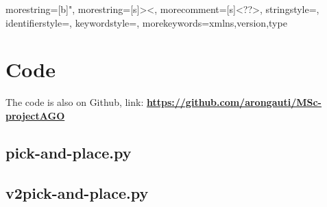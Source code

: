 


{
  morestring=[b]",
  morestring=[s]{>}{<},
  morecomment=[s]{<?}{?>},
  stringstyle=\color{black},
  identifierstyle=\color{darkblue},
  keywordstyle=\color{cyan},
  morekeywords={xmlns,version,type}%
}
\appendix



\chapter{Code}  \label{app:code}
The code is also on Github, link: \textbf{\url{https://github.com/arongauti/MSc-projectAGO}}
\section{pick-and-place.py}\label{sec:pickandplace}

\clearpage

\section{v2pick-and-place.py}\label{sec:v2pickandplace}

\clearpage

